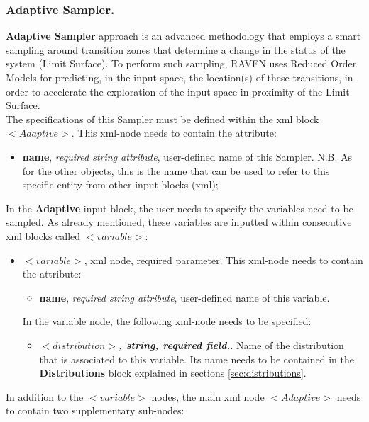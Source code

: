 \subsubsection{Adaptive Sampler.}
\label{subsubsubsec:AdaptiveSampling}
\textbf{Adaptive Sampler} approach is an advanced methodology that employs a smart sampling around transition zones that determine a change in the status of the system (Limit Surface). To perform such sampling, RAVEN uses Reduced Order Models for predicting, in the input space, the location(s) of these transitions, in order to accelerate the exploration of the input space in proximity of the Limit Surface.
\\ The specifications of this Sampler must be defined within the xml block $<Adaptive>$. This xml-node needs to contain the attribute:
\begin{itemize}
\itemsep0em
\item \textbf{name}, \textit{required string attribute}, user-defined name of this Sampler. N.B. As for the other objects, this is the name that can be used to refer to this specific entity from other input blocks (xml);
\end{itemize}
In the \textbf{Adaptive} input block, the user needs to specify the variables need to be sampled. As already mentioned, these variables are inputted within consecutive xml blocks called $<variable>$:
\begin{itemize}
\item $<variable>$, xml node, required parameter. This xml-node needs to contain the attribute:
\begin{itemize}
  \item \textbf{name}, \textit{required string attribute}, user-defined name of this variable. 
 \end{itemize}
 In the variable node, the following xml-node needs to be specified:
 \begin{itemize}
    \item $<distribution>$\textbf{\textit{, string, required field.}}. Name of the distribution that is associated to this variable. Its name needs to be contained in the \textbf{Distributions} block explained in sections \ref{sec:distributions}.
  \end{itemize}
\end{itemize}
 In addition to the $<variable>$ nodes,  the main xml node $<Adaptive>$ needs to contain two supplementary sub-nodes:
